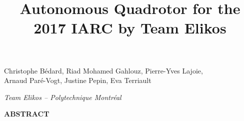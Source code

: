 \documentclass[12pt,letterpaper]{article}
\title{Autonomous Quadrotor for the 2017 IARC by Team Elikos}
\newenvironment{nscenter}
{\parskip=0pt\par\nopagebreak\centering}
{\par\noindent\ignorespacesafterend}
\newcommand{\affiliatedauthors}[1]{
	\begin{nscenter}
		#1
	\end{nscenter}
}
\newcommand{\affiliateduniversity}[1]{
	\begin{nscenter}
		\textit{#1}
	\end{nscenter}
}
\renewcommand{\abstractname}{ABSTRACT}
\renewenvironment{abstract}
{\vspace{-0.5ex}
	\small
	\begin{center}
		\bfseries \abstractname\vspace{-4ex}\vspace{0pt}
	\end{center}
	\list{}{
		\setlength{\leftmargin}{0.5in}
		\setlength{\rightmargin}{\leftmargin}
	}
	\item\relax}
{\endlist}
\begin{document}
	
	\begin{center}
		\textbf{\LARGE{\thetitle}}
	\end{center}
	
	\affiliatedauthors{Christophe Bédard, Riad Mohamed Gahlouz, Pierre-Yves Lajoie, \\ Arnaud Paré-Vogt, Justine Pepin, Eva Terriault}
	\affiliateduniversity{Team Elikos -- Polytechnique Montréal}
	
	
	\begin{abstract}
		
	\end{abstract}
	
	
	
	
	
	
	
	
	
	
	
	
	
	\printbibliography
	
\end{document}
